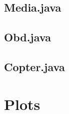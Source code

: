 \documentclass[hidelinks, 12pt, a4paper]{article}
\begin{document}


\subsection{Media.java}



\subsection{Obd.java}



\subsection{Copter.java}



\section{Plots}



\end{document}
